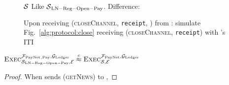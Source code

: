 \begin{figure}[H]
  \begin{simulatorbox}{$\mathcal{S}$}
    Like $\mathcal{S}{}_{\mathrm{LN - Reg - Open - Pay}}$. Difference:
    \begin{algorithmic}[1]
      \State Upon receiving (\textsc{closeChannel}, \texttt{receipt}, \alice)
      from \fpaynet:
      \Indent
        \State simulate Fig.~\ref{alg:protocol:close} receiving
        (\textsc{closeChannel}, \texttt{receipt}) with \alice's ITI
      \EndIndent
    \end{algorithmic}
  \end{simulatorbox}
  \caption{}
  \label{alg:sim:close}
\end{figure}

\begin{lemma}
  \label{lemma:close}
  $\textsc{Exec}^{\mathcal{F}_{\mathrm{PayNet}}{}_{\mathrm{, Pay}}, \mathcal{G}_{\mathrm{Ledger}}}_{\mathcal{S}_{\mathrm{LN
  - Reg - Open - Pay}}, \mathcal{E}} \overset{c}{\approx}
  \textsc{Exec}^{\mathcal{F}_{\mathrm{PayNet}}, \mathcal{G}_{\mathrm{Ledger}}}_{\mathcal{S}, \mathcal{E}}$
\end{lemma}

\begin{proof}
  When \environment{} sends (\textsc{getNews}) to \alice,
\end{proof}
